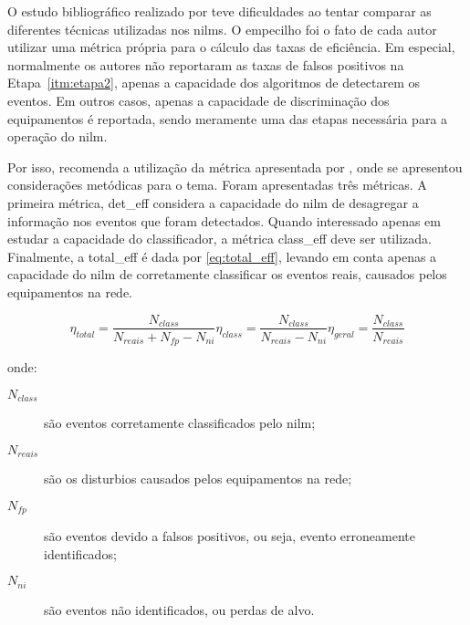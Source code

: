 O estudo bibliográfico realizado por \cite{nilm_zeifman_review_2011}
teve dificuldades ao tentar comparar as diferentes técnicas utilizadas
nos \glspl{nilm}. O empecilho foi o fato de cada autor
utilizar uma métrica própria para o cálculo das taxas de eficiência.
Em especial, normalmente os autores não reportaram as taxas de falsos
positivos na Etapa~\ref{itm:etapa2}, apenas a capacidade dos
algoritmos de detectarem os eventos. Em outros casos, apenas a
capacidade de discriminação dos equipamentos é reportada, sendo
meramente uma das etapas necessária para a operação do \gls{nilm}.

Por isso, \cite{nilm_zeifman_review_2011} recomenda a utilização da
métrica apresentada por \cite{nilm_liang_pt1_2010_34}, onde se
apresentou considerações metódicas para o tema. Foram apresentadas
três métricas. A primeira métrica, \gls{det_eff} considera a
capacidade do \gls{nilm} de desagregar a informação nos eventos que
foram detectados. Quando interessado apenas em estudar a capacidade do
classificador, a métrica \gls{class_eff} deve ser utilizada.
Finalmente, a \gls{total_eff} é dada por \ref{eq:total_eff}, levando em
conta apenas a capacidade do \gls{nilm} de corretamente classificar os
eventos reais, causados pelos equipamentos na rede.

\begin{subequations}\label{eq:eff}
\begin{equation}\label{eq:det_eff}
\eta_{total} = \frac{N_{class}}{N_{reais} + N_{fp} - N_{ni}}
\end{equation}
\begin{equation}\label{eq:class_eff}
\eta_{class} = \frac{N_{class}}{N_{reais} - N_{ni}}
\end{equation}
\begin{equation}\label{eq:total_eff}
\eta_{geral} = \frac{N_{class}}{N_{reais}}
\end{equation}
\end{subequations}

\noindent onde:  

\begin{description}
\item[$N_{class}$] são eventos corretamente classificados pelo
\gls{nilm}; 
\item[$N_{reais}$] são os disturbios causados pelos equipamentos
na rede;
\item[$N_{fp}$] são eventos devido a falsos positivos, ou seja,
evento erroneamente identificados;
\item[$N_{ni}$] são eventos não identificados, ou perdas de alvo.
\end{description}


